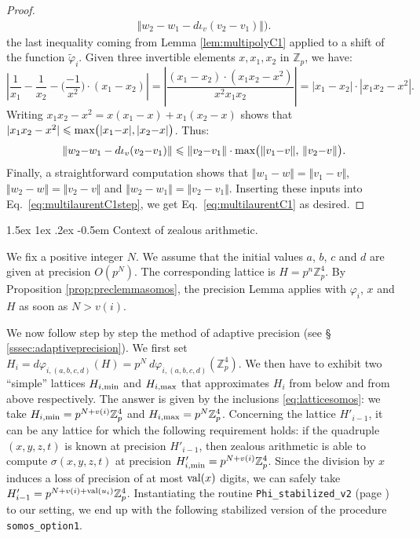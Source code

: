 \documentclass[11pt]{article}
\makeatletter
\numberwithin{equation}{section}
\numberwithin{figure}{section}
\renewcommand\subparagraph{\@startsection{subparagraph}{5}{\z@}%
                                       {1.5ex \@plus1ex \@minus .2ex}%
                                       {-0.5em}%
                                      {\normalfont\normalsize\it}}
\renewcommand{\leq}{\leqslant}
\theoremstyle{definition}
\newcommand{\Z}{\mathbb Z}
\newcommand{\Zp}{\Z_p}
\renewcommand{\min}{\text{\rm min}}
\renewcommand{\max}{\text{\rm max}}
\newcommand{\val}{\text{\rm val}}
\makeatother
\begin{document}
\begin{proof}
\begin{align}
  \Vert w_2{-}w_1 - d \iota_v (v_2{-}v_1) \Vert\big).
  \label{eq:multilaurentC1step}
\end{align}
the last inequality coming from Lemma \ref{lem:multipolyC1} applied to a 
shift of the function $\tilde \varphi_i$. Given three invertible 
elements $x, x_1, x_2$ in $\Zp$, we have:
$$\left|\frac 1{x_1} - \frac 1{x_2} - \Big(\frac{-1}{x^2}\Big) \cdot (x_1{-}x_2) \right| 
= \left| \frac{(x_1{-}x_2) \cdot (x_1 x_2 - x^2)}{x^2 x_1 x_2} \right|
= |x_1{-}x_2| \cdot |x_1 x_2 - x^2|.$$
Writing $x_1 x_2 - x^2 = x (x_1 - x) + x_1 (x_2 - x)$ shows
that $|x_1 x_2 - x^2| \leq \max\big(|x_1{-}x|, |x_2{-}x|\big)$. Thus:
$$\Vert w_2{-}w_1 - d \iota_v (v_2{-}v_1) \Vert \leq
\Vert v_2{-}v_1 \Vert \cdot \max\big(\Vert v_1{-}v \Vert, \,
\Vert v_2{-}v \Vert\big).$$
Finally, a straightforward computation shows that $\Vert w_1{-}w \Vert = 
\Vert v_1{-}v \Vert$, $\Vert w_2{-}w \Vert = \Vert v_2{-}v \Vert$ and 
$\Vert w_2{-}w_1 \Vert = \Vert v_2{-}v_1 \Vert$. Inserting these inputs
into Eq.~\eqref{eq:multilaurentC1step}, we get Eq.~\eqref{eq:multilaurentC1} 
as desired.
\end{proof}

\subparagraph{Context of zealous arithmetic.}

We fix a positive integer $N$. We assume that the initial values $a$, 
$b$, $c$ and $d$ are given at precision $O(p^N)$. The corresponding 
lattice is $H = p^n \Zp^4$. By Proposition \ref{prop:preclemmasomos}, 
the precision Lemma applies with $\varphi_i$, $x$ and $H$ as soon as $N 
> v(i)$.

We now follow step by step the method of adaptive precision (see \S 
\ref{sssec:adaptiveprecision}). 
We first set $H_i = d\varphi_{i,(a,b,c,d)}(H) = p^N \: 
d\varphi_{i,(a,b,c,d)} (\Zp^4)$. We then have to exhibit two ``simple'' 
lattices $H_{i,\min}$ and $H_{i,\max}$ that approximates $H_i$ from 
below and from above respectively. The answer is given by the inclusions 
\eqref{eq:latticesomos}: we take $H_{i,\min} = p^{N+v(i)} \Zp^4$ and 
$H_{i,\max} = p^N \Zp^4$. Concerning the lattice $H'_{i-1}$, it can be any 
lattice for which the following requirement holds: if the quadruple 
$(x,y,z,t)$ is known at precision $H'_{i-1}$, then zealous 
arithmetic is able to compute $\sigma(x,y,z,t)$ at precision 
$H'_{i,\min} = p^{N+v(i)} \Zp^4$. Since the division by $x$ induces
a loss of precision of at most $\val(x)$ digits, we can safely take
$H'_{i-1} = p^{N+v(i)+\val(u_i)} \Zp^4$.
Instantiating the routine \texttt{Phi\_stabilized\_v2} (page 
\pageref{algo:phistabzealousv2}) to our setting, we end up with the following stabilized 
version of the procedure \texttt{somos\_option1}.
\end{document}
